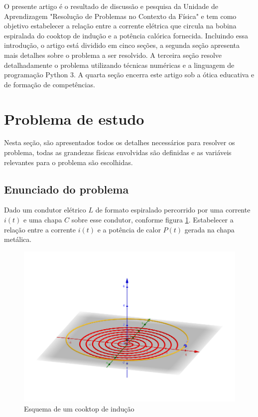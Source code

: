 \documentclass[
	article,			%
	11pt,				%
	oneside,			%
	a4paper,			%
	english,			%
	brazil,				%
	sumario=tradicional
	]{abntex2}
\begin{document}
O presente artigo é o resultado de discussão e pesquisa da Unidade de Aprendizagem "Resolução de Problemas no Contexto da Física" e tem como objetivo estabelecer a relação entre a corrente elétrica que circula na bobina espiralada do cooktop de indução e a potência calórica fornecida. Incluindo essa introdução, o artigo está dividido em cinco seções, a segunda seção apresenta mais detalhes sobre o problema a ser resolvido. A terceira seção resolve detalhadamente o problema utilizando técnicas numéricas e a linguagem de programação Python 3. A quarta seção encerra este artigo sob a ótica educativa e de formação de competências.

\section{Problema de estudo}

Nesta seção, são apresentados todos os detalhes necessários para resolver os problema, todas as grandezas físicas envolvidas são definidas e as variáveis relevantes para o problema são escolhidas.

\subsection{Enunciado do problema}

Dado um condutor elétrico $ L $ de formato espiralado percorrido por uma corrente $ i(t) $ e uma chapa $ C $ sobre esse condutor, conforme figura \ref{fig:esquema}. Estabelecer a relação entre a corrente $ i(t) $ e a potência de calor $ P(t) $ gerada na chapa metálica.

\begin{figure}[h]
	\centering
	\includegraphics[width=0.7\linewidth]{figures/fig1}
	\caption[Esquema de um cooktop de indução]{Esquema de um cooktop de indução}
	\label{fig:esquema}
\end{figure}
\end{document}
